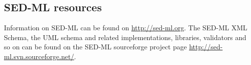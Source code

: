 \subsection{SED-ML resources}

Information on SED-ML can be found on \url{http://sed-ml.org}. The SED-ML XML Schema, the UML schema and related implementations, libraries, validators and so on can be found on the SED-ML sourceforge project page \url{http://sed-ml.svn.sourceforge.net/}.



